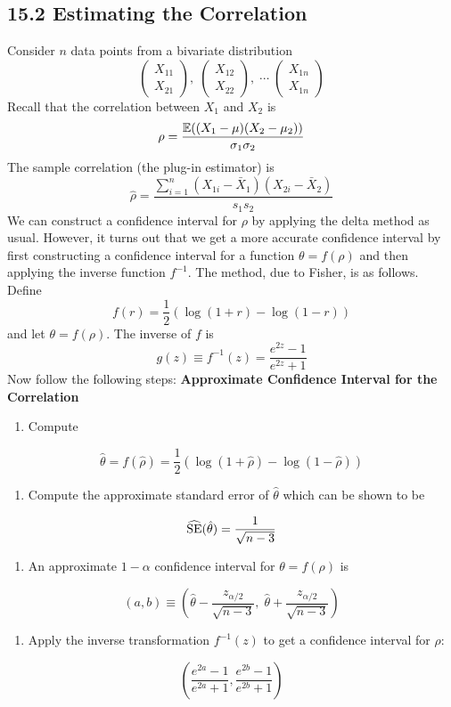 \subsection*{15.2 Estimating the
Correlation}\label{estimating-the-correlation}
Consider \(n\) data points from a bivariate distribution
\[
\begin{pmatrix} X_{11} \\ X_{21}\end{pmatrix}, \;
\begin{pmatrix} X_{12} \\ X_{22}\end{pmatrix}, \;
\cdots \;
\begin{pmatrix} X_{1n} \\ X_{1n}\end{pmatrix}
\]
Recall that the correlation between \(X_{1}\) and \(X_{2}\) is
\[
\rho = \frac{\operatorname{\mathbb{E}}((X_{1} - \mu) (X_{2} - \mu_{2}))}{\sigma_{1} \sigma_{2}}
\]
The sample correlation (the plug-in estimator) is
\[
\hat{\rho} = \frac{\sum_{i=1}^{n} (X_{1i} - \bar{X}_{1})(X_{2i} - \bar{X}_{2})}{s_{1} s_{2}}
\]
We can construct a confidence interval for \(\rho\) by applying the
delta method as usual. However, it turns out that we get a more accurate
confidence interval by first constructing a confidence interval for a
function \(\theta = f(\rho)\) and then applying the inverse function
\(f^{-1}\). The method, due to Fisher, is as follows. Define
\[
f(r) = \frac{1}{2} \left( \log(1 + r) - \log(1 - r)\right)
\]
and let \(\theta = f(\rho)\). The inverse of \(f\) is
\[
g(z) \equiv f^{-1}(z) = \frac{e^{2z} - 1}{e^{2z} + 1}
\]
Now follow the following steps:
\textbf{Approximate Confidence Interval for the Correlation}
\begin{enumerate}[tightlist,label={\arabic*.}]
\item
  Compute
\end{enumerate}
\[
\hat{\theta} = f(\hat{\rho}) = \frac{1}{2} \left( \log(1 + \hat{\rho}) - \log(1 - \hat{\rho})\right)
\]
\begin{enumerate}[tightlist,label={\arabic*.},resume]
\item
  Compute the approximate standard error of \(\hat{\theta}\) which can
  be shown to be
\end{enumerate}
\[
\widehat{\operatorname{\mathrm{SE}}}(\hat{\theta}) = \frac{1}{\sqrt{n - 3}}
\]
\begin{enumerate}[tightlist,label={\arabic*.},resume]
\item
  An approximate \(1 - \alpha\) confidence interval for
  \(\theta = f(\rho)\) is
\end{enumerate}
\[
(a, b) \equiv \left(\hat{\theta} - \frac{z_{\alpha/2}}{\sqrt{n - 3}}, \; \hat{\theta} + \frac{z_{\alpha/2}}{\sqrt{n - 3}} \right)
\]
\begin{enumerate}[tightlist,label={\arabic*.},resume]
\item
  Apply the inverse transformation \(f^{-1}(z)\) to get a confidence
  interval for \(\rho\):
\end{enumerate}
\[
\left( \frac{e^{2a} - 1}{e^{2a} + 1}, \frac{e^{2b} - 1}{e^{2b} + 1} \right)
\]

